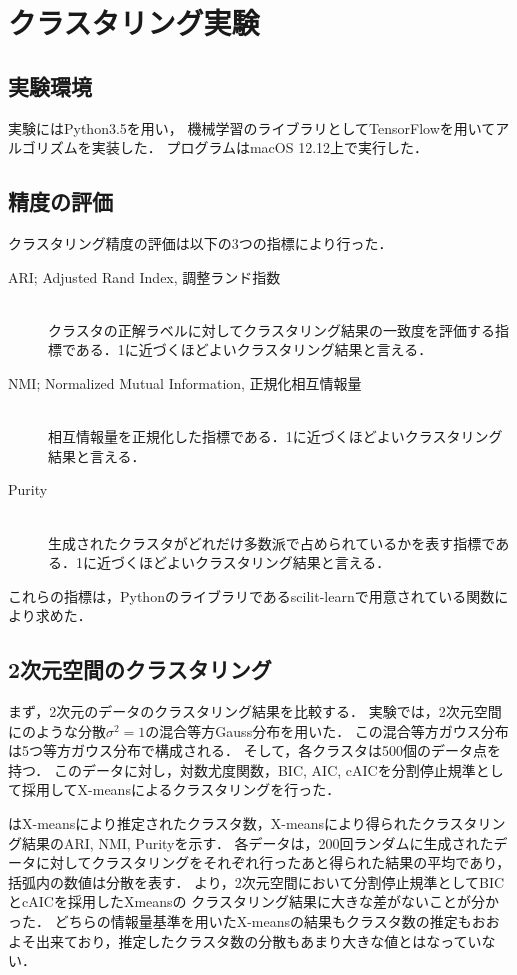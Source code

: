 \section{クラスタリング実験}

\subsection{実験環境}

実験にはPython3.5を用い，
機械学習のライブラリとしてTensorFlowを用いてアルゴリズムを実装した．
プログラムはmacOS 12.12上で実行した．

\subsection{精度の評価}

クラスタリング精度の評価は以下の3つの指標により行った．
\begin{description}
  \item[ARI; Adjusted Rand Index, 調整ランド指数]~\\
    クラスタの正解ラベルに対してクラスタリング結果の一致度を評価する指標である．1に近づくほどよいクラスタリング結果と言える．
  \item[NMI; Normalized Mutual Information, 正規化相互情報量]~\\
    相互情報量を正規化した指標である．1に近づくほどよいクラスタリング結果と言える．
  \item[Purity]~\\
    生成されたクラスタがどれだけ多数派で占められているかを表す指標である．1に近づくほどよいクラスタリング結果と言える．
\end{description}
これらの指標は，Pythonのライブラリであるscilit-learnで用意されている関数により求めた．

\subsection{2次元空間のクラスタリング}

まず，2次元のデータのクラスタリング結果を比較する．
実験では，2次元空間にのような分散$\sigma^2=1$の混合等方Gauss分布を用いた．
この混合等方ガウス分布は5つ等方ガウス分布で構成される．
そして，各クラスタは500個のデータ点を持つ．
このデータに対し，対数尤度関数，BIC, AIC, cAICを分割停止規準として採用してX-meansによるクラスタリングを行った．

はX-meansにより推定されたクラスタ数，X-meansにより得られたクラスタリング結果のARI, NMI, Purityを示す．
各データは，200回ランダムに生成されたデータに対してクラスタリングをそれぞれ行ったあと得られた結果の平均であり，括弧内の数値は分散を表す．
より，2次元空間において分割停止規準としてBICとcAICを採用したXmeansの
クラスタリング結果に大きな差がないことが分かった．
どちらの情報量基準を用いたX-meansの結果もクラスタ数の推定もおおよそ出来ており，推定したクラスタ数の分散もあまり大きな値とはなっていない．

